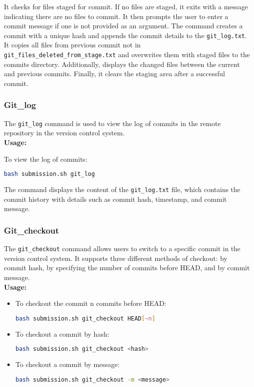 \documentclass{article}
\begin{document}
It checks for files staged for commit. If no files are staged, it exits with a message indicating there are no files to commit. It then prompts the user to enter a commit message if one is not provided as an argument. The command creates a commit with a unique hash and appends the commit details to the \texttt{git\_log.txt}. It copies all files from previous commit not in \texttt{git\_files\_deleted\_from\_stage.txt} and overwrites them with staged files to the commits directory. Additionally, displays the changed files between the current and previous commits. Finally, it clears the staging area after a successful commit.

\subsubsection{Git\_log}
The \texttt{git\_log} command is used to view the log of commits in the remote repository in the version control system.\\
\textbf{Usage:}
\begin{adjustwidth}{0.5cm}{0cm}
To view the log of commits:
\begin{lstlisting}[language=bash]
bash submission.sh git_log
\end{lstlisting}
\end{adjustwidth}

The command displays the content of the \texttt{git\_log.txt} file, which contains the commit history with details such as commit hash, timestamp, and commit message.

\subsubsection{Git\_checkout}
The \texttt{git\_checkout} command allows users to switch to a specific commit in the version control system. It supports three different methods of checkout: by commit hash, by specifying the number of commits before HEAD, and by commit message.\\
\textbf{Usage:}
\begin{itemize}
    \item To checkout the commit n commits before HEAD:
    \begin{lstlisting}[language=bash]
    bash submission.sh git_checkout HEAD[~n]
    \end{lstlisting}
    \item To checkout a commit by hash:
    \begin{lstlisting}[language=bash]
    bash submission.sh git_checkout <hash>
    \end{lstlisting}
    \item To checkout a commit by message:
    \begin{lstlisting}[language=bash]
    bash submission.sh git_checkout -m <message>
    \end{lstlisting}
\end{itemize}
\end{document}
